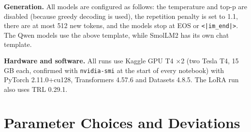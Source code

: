 \documentclass[10pt]{article}
\begin{document}
\textbf{Generation.} All models are configured as follows: the temperature and top-p are disabled (because greedy decoding is used), the repetition penalty is set to 1.1, there are at most 512 new tokens, and the models stop at EOS or \texttt{<|im\_end|>}. The Qwen models use the above template, while SmolLM2 has its own chat template.

\textbf{Hardware and software.} All runs use Kaggle GPU T4 $\times$2 (two Tesla T4, 15\,GB each, confirmed with \texttt{nvidia-smi} at the start of every notebook) with PyTorch 2.11.0+cu128, Transformers 4.57.6 and Datasets 4.8.5. The LoRA run also uses TRL 0.29.1.

\section{Parameter Choices and Deviations}
\end{document}
